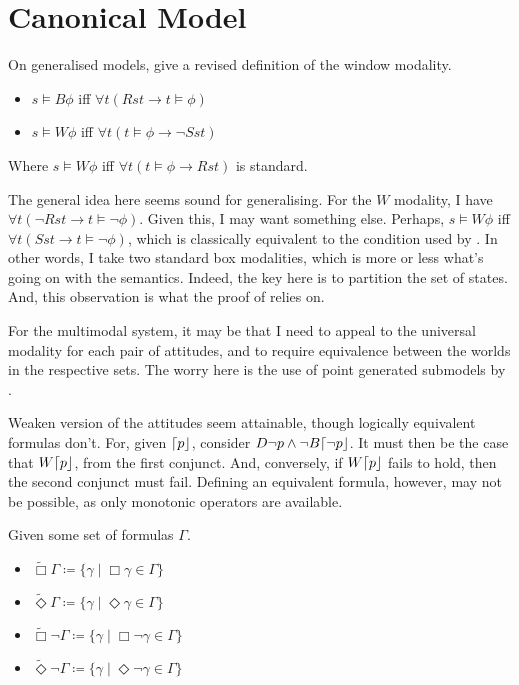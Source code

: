 \documentclass[10pt]{article}
\begin{document}
\section{Canonical Model}
\label{sec:canonical-model}

On generalised models, \citeauthor{Gargov:1987aa} give a revised definition of the window modality.

\begin{itemize}
\item \(s \vDash B\phi\) iff \(\forall t(Rst \rightarrow t \vDash \phi)\)
\item \(s \vDash W\phi\) iff \(\forall t(t \vDash \phi \rightarrow \lnot Sst)\)
\end{itemize}

Where \(s \vDash W\phi\) iff \(\forall t(t \vDash \phi \rightarrow Rst)\) is standard.

The general idea here seems sound for generalising.
For the \(W\) modality, I have \(\forall t(\lnot Rst \rightarrow t \vDash \lnot\phi)\).
Given this, I may want something else.
Perhaps, \(s \vDash W\phi \) iff \(\forall t(Sst \rightarrow t \vDash \lnot\phi)\), which is classically equivalent to the condition used by \citeauthor{Gargov:1987aa}.
In other words, I take two standard box modalities, which is more or less what's going on with the semantics.
Indeed, the key here is to partition the set of states.
And, this observation is what the proof of \citeauthor{Gargov:1987aa} relies on.

For the multimodal system, it may be that I need to appeal to the universal modality for each pair of attitudes, and to require equivalence between the worlds in the respective sets.
The worry here is the use of point generated submodels by \citeauthor{Gargov:1987aa}.

\begin{note}
  Weaken version of the attitudes seem attainable, though logically equivalent formulas don't.
  For, given \(\mathord{\lceil{p}\rfloor}\), consider \(D\lnot p \land \lnot B\mathord{\lceil{\lnot p}\rfloor}\).
  It must then be the case that \(W\mathord{\lceil{p}\rfloor}\), from the first conjunct.
  And, conversely, if \(W\mathord{\lceil{p}\rfloor}\) fails to hold, then the second conjunct must fail.
  Defining an equivalent formula, however, may not be possible, as only monotonic operators are available.
\end{note}

\begin{definition}
  Given some set of formulas \(\Gamma\).
  \begin{itemize}
  \item \(\widetilde{\Box}\Gamma \coloneq \{ \gamma \mid \Box\gamma \in \Gamma \}\)
  \item \(\widetilde{\Diamond}\Gamma \coloneq \{ \gamma \mid \Diamond\gamma \in \Gamma \}\)
  \item \(\widetilde{\Box}\lnot\Gamma \coloneq \{ \gamma \mid \Box\lnot\gamma \in \Gamma \}\)
  \item \(\widetilde{\Diamond}\lnot\Gamma \coloneq \{ \gamma \mid \Diamond\lnot\gamma \in \Gamma \}\)
  \end{itemize}
\end{definition}
\end{document}

